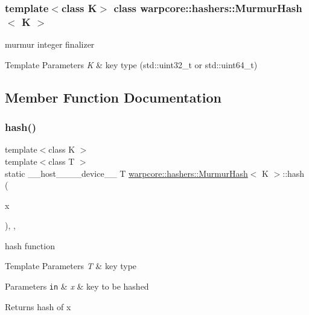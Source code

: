 \subsubsection*{template$<$class K$>$\newline
class warpcore\+::hashers\+::\+Murmur\+Hash$<$ K $>$}

murmur integer finalizer 


\begin{DoxyTemplParams}{Template Parameters}
{\em K} & key type ({\ttfamily std\+::uint32\+\_\+t} or std\+::uint64\+\_\+t) \\
\hline
\end{DoxyTemplParams}


\subsection{Member Function Documentation}
\mbox{\label{classwarpcore_1_1hashers_1_1MurmurHash_aa54d11b7c827b9d62c77dda71e505047}} 
\subsubsection{\texorpdfstring{hash()}{hash()}}
{\footnotesize\ttfamily template$<$class K $>$ \\
template$<$class T $>$ \\
static \+\_\+\+\_\+host\+\_\+\+\_\+\+\_\+\+\_\+device\+\_\+\+\_\+ T \hyperlink{classwarpcore_1_1hashers_1_1MurmurHash}{warpcore\+::hashers\+::\+Murmur\+Hash}$<$ K $>$\+::hash (\begin{DoxyParamCaption}\item[{T}]{x }\end{DoxyParamCaption})\hspace{0.3cm}{\ttfamily [inline]}, {\ttfamily [static]}, {\ttfamily [noexcept]}}



hash function 


\begin{DoxyTemplParams}{Template Parameters}
{\em T} & key type \\
\hline
\end{DoxyTemplParams}

\begin{DoxyParams}[1]{Parameters}
\mbox{\tt in}  & {\em x} & key to be hashed \\
\hline
\end{DoxyParams}
\begin{DoxyReturn}{Returns}
hash of {\ttfamily x} 
\end{DoxyReturn}
